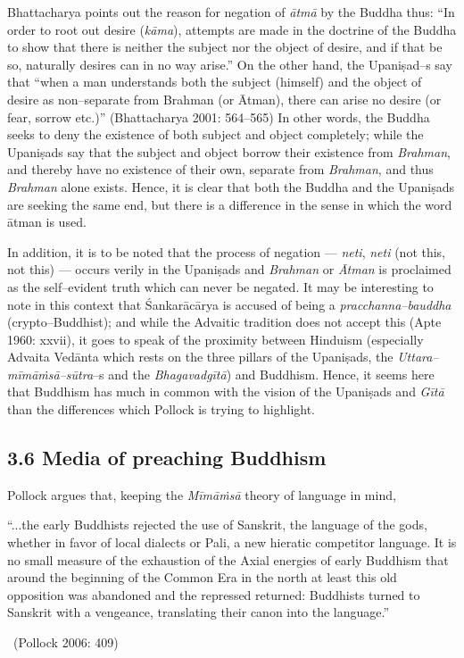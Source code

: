 Bhattacharya points out the reason for negation of \textit{ātmā} by the Buddha thus: “In order to root out desire (\textit{kāma}), attempts are made in the doctrine of the Buddha to show that there is neither the subject nor the object of desire, and if that be so, naturally desires can in no way arise.” On the other hand, the Upaniṣad–s say that “when a man understands both the subject (himself) and the object of desire as non–separate from Brahman (or Ātman), there can arise no desire (or fear, sorrow etc.)” (Bhattacharya 2001: 564–565) In other words, the Buddha seeks to deny the existence of both subject and object completely; while the Upaniṣads say that the subject and object borrow their existence from \textit{Brahman}, and thereby have no existence of their own, separate from \textit{Brahman}, and thus \textit{Brahman} alone exists. Hence, it is clear that both the Buddha and the Upaniṣads are seeking the same end, but there is a difference in the sense in which the word ātman is used.

In addition, it is to be noted that the process of negation — \textit{neti}, \textit{neti} (not this, not this) — occurs verily in the Upaniṣads and \textit{Brahman} or \textit{Ātman} is proclaimed as the self–evident truth which can never be negated. It may be interesting to note in this context that Śankarācārya is accused of being a \textit{pracchanna–bauddha }(crypto–Buddhist); and while the Advaitic tradition does not accept this (Apte 1960: xxvii), it goes to speak of the proximity between Hinduism (especially Advaita Vedānta which rests on the three pillars of the Upaniṣads, the \textit{Uttara–mīmāṁsā–sūtra}–s and the \textit{Bhagavadgītā}) and Buddhism. Hence, it seems here that Buddhism has much in common with the vision of the Upaniṣads and \textit{Gītā} than the differences which Pollock is trying to highlight.


\subsection*{3.6 Media of preaching Buddhism}

Pollock argues that, keeping the \textit{Mīmāṁsā} theory of language in mind,

\begin{myquote}
“...the early Buddhists rejected the use of Sanskrit, the language of the gods, whether in favor of local dialects or Pali, a new hieratic competitor language. It is no small measure of the exhaustion of the Axial energies of early Buddhism that around the beginning of the Common Era in the north at least this old opposition was abandoned and the repressed returned: Buddhists turned to Sanskrit with a vengeance, translating their canon into the language.” 

~\hfill (Pollock 2006: 409)
\end{myquote}

